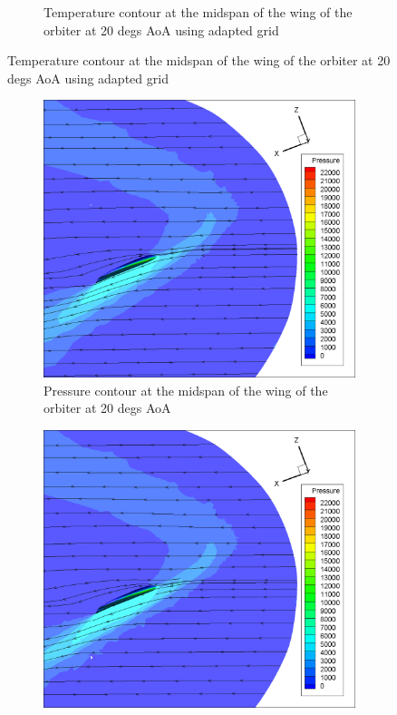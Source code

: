 \begin{figure}[H]
\begin{subfigure}[b]{0.65\textwidth}
		 \caption{Temperature contour at the midspan of the wing of the orbiter at 20 degs AoA using adapted grid}
		 \label{fig: 20_adapt_sym_temp_contour}
    \end{subfigure}
\end{figure}

\begin{figure}[H]

	\centering
    \begin{subfigure}[b]{0.65\textwidth}
         \centering
		 \includegraphics[width=\textwidth]{report_images/20_wing_pressure_contour.png}
		 \caption{Pressure contour at the midspan of the wing of the orbiter at 20 degs AoA}
		 \label{fig: 20_wing_pressure_contour}
    \end{subfigure} 
    \begin{subfigure}[b]{0.65\textwidth}
         \centering
		 \includegraphics[width=\textwidth]{report_images/20_adapted_wing_pressure_contour.png}

\end{subfigure}
\end{figure}
